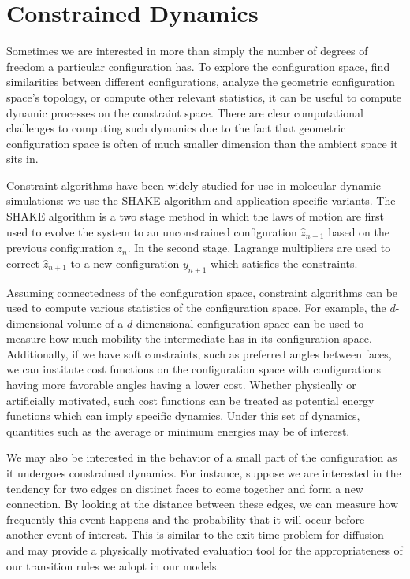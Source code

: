 \section{Constrained Dynamics}

Sometimes we are interested in more than simply the number of degrees of freedom a particular configuration has. To explore the configuration space, find similarities between different configurations, analyze the geometric configuration space's topology, or compute other relevant statistics, it can be useful to compute dynamic processes on the constraint space. There are clear computational challenges to computing such dynamics due to the fact that geometric configuration space is often of much smaller dimension than the ambient space it sits in.

Constraint algorithms have been widely studied for use in molecular dynamic simulations: we use the SHAKE algorithm and application specific variants. The SHAKE algorithm is a two stage method in which the laws of motion are first used to evolve the system to an unconstrained configuration $\hat{z}_{n+1}$ based on the previous configuration $z_n$. In the second stage, Lagrange multipliers are used to correct $\hat{z}_{n+1}$ to a new configuration $y_{n+1}$ which satisfies the constraints. 

Assuming connectedness of the configuration space, constraint algorithms can be used to compute various statistics of the configuration space. For example, the $d$-dimensional volume of a $d$-dimensional configuration space can be used to measure how much mobility the intermediate has in its configuration space. Additionally, if we have soft constraints, such as preferred angles between faces, we can institute cost functions on the configuration space with configurations having more favorable angles having a lower cost. Whether physically or artificially motivated, such cost functions can be treated as potential energy functions which can imply specific dynamics. Under this set of dynamics, quantities such as the average or minimum energies may be of interest. 

We may also be interested in the behavior of a small part of the configuration as it undergoes constrained dynamics. For instance, suppose we are interested in the tendency for two edges on distinct faces to come together and form a new connection. By looking at the distance between these edges, we can measure how frequently this event happens and the probability that it will occur before another event of interest. This is similar to the exit time problem for diffusion and may provide a physically motivated evaluation tool for the appropriateness of our transition rules we adopt in our models. 

